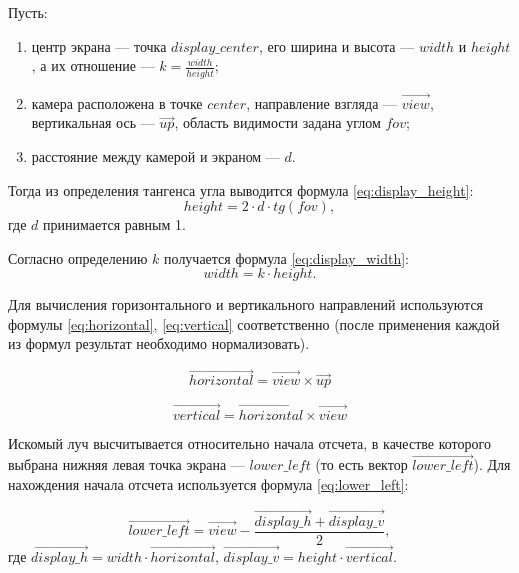 Пусть:
\begin{enumerate}
	\item центр экрана --- точка $display\_center$, его ширина и высота --- $width$ и $height$, а их отношение --- $k = \frac{width}{height}$;
	\item камера расположена в точке $center$, направление взгляда --- $\overrightarrow{view}$, вертикальная ось --- $\overrightarrow{up}$, область видимости задана углом $fov$;
	\item расстояние между камерой и экраном --- $d$.
\end{enumerate}

Тогда из определения тангенса угла выводится формула \ref{eq:display_height}:
\begin{equation}\label{eq:display_height}
	height = 2 \cdot d \cdot tg(fov),
\end{equation}
где $d$ принимается равным 1.

Согласно определению $k$ получается формула \ref{eq:display_width}:
\begin{equation}\label{eq:display_width}
	width = k \cdot height.
\end{equation}

Для вычисления горизонтального и вертикального направлений используются формулы \ref{eq:horizontal}, \ref{eq:vertical} соответственно (после применения каждой из формул результат необходимо нормализовать).

\begin{equation}\label{eq:horizontal}
	\overrightarrow{horizontal} = \overrightarrow{view} \times \overrightarrow{up}
\end{equation}

\begin{equation}\label{eq:vertical}
	\overrightarrow{vertical} = \overrightarrow{horizontal} \times \overrightarrow{view}
\end{equation}

Искомый луч высчитывается относительно начала отсчета, в качестве которого выбрана нижняя левая точка экрана --- $lower\_left$ (то есть вектор $\overrightarrow{lower\_left}$).
Для нахождения начала отсчета используется формула \ref{eq:lower_left}:

\begin{equation}\label{eq:lower_left}
	\overrightarrow{lower\_left} = \overrightarrow{view} - \frac{\overrightarrow{display\_h} + \overrightarrow{display\_v}}{2},
\end{equation}
где $\overrightarrow{display\_h} = width \cdot \overrightarrow{horizontal}$, $\overrightarrow{display\_v} = height \cdot \overrightarrow{vertical}$.

